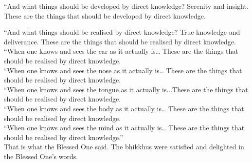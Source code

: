 \documentclass[11pt]{article}
\begin{document}
“And what things should be developed by direct knowledge? Serenity and insight. These are the things that should be developed by direct knowledge.\

“And what things should be realised by direct knowledge? True knowledge and deliverance. These are the things that should be realised by direct knowledge.\\
“When one knows and sees the ear as it actually is… These are the things that should be realised by direct knowledge.\\

“When one knows and sees the nose as it actually is… These are the things that should be realised by direct knowledge.\\

“When one knows and sees the tongue as it actually is...These are the things that should be realised by direct knowledge.\\

“When one knows and sees the body as it actually is… These are the things that should be realised by direct knowledge.\\

“When one knows and sees the mind as it actually is… These are the things that should be realised by direct knowledge.”\\

That is what the Blessed One said. The bhikkhus were satisfied and delighted in the Blessed One’s words.\\
\end{document}
